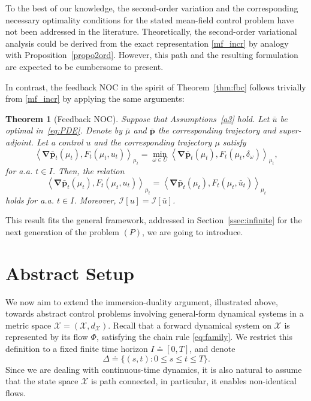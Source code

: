 \documentclass[sn-mathphys-num]{sn-jnl}
\numberwithin{equation}{section}
\theoremstyle{mythm}
\newtheorem{theorem}[proposition]{Theorem}
\theoremstyle{mydef}
\renewcommand{\mathbf}[1]{\bm{#1}}
\begin{document}
To the best of our knowledge, the second-order variation and the corresponding necessary optimality conditions for the stated mean-field control problem have not been addressed in the literature. Theoretically, the second-order variational analysis could be derived from the exact representation \eqref{mf_incr} by analogy with Proposition~\ref{propo2ord}. However, this path and the resulting formulation are expected to be cumbersome to present.

In contrast, the feedback NOC in the spirit of Theorem~\ref{thm:fbc} follows trivially from \eqref{mf_incr} by applying the same arguments:
\begin{theorem}[Feedback NOC]
  \label{thm:W-FNOC}
  Suppose that Assumptions~\ref{a3} hold. Let \( \bar{u} \) be optimal in~\eqref{eq:PDE}. Denote by \( \bar{\mu} \) and \( \mathbf{\bar{p}} \) the corresponding trajectory and super-adjoint. Let a control \( u \) and the corresponding trajectory \( \mu \) satisfy
\[
  \left<\mathbf{\nabla}\bar{\mathbf{p}}_t(\mu_t), F_t({\mu}_t,{u}_t)\right>_{{\mu}_t}  = \min_{\omega\in U} \left<\mathbf{\nabla}\bar{\mathbf{p}}_t(\mu_t),F_t(\mu_t,\delta_{\omega}) \right>_{\mu_t},
\]
for a.a. \( t\in I \). Then, the relation 
\[
\left<\mathbf{\nabla}\bar{\mathbf{p}}_t(\mu_t), F_t({\mu}_t,{u}_t)\right>_{{\mu}_t} = 
  \left<\mathbf{\nabla}\bar{\mathbf{p}}_t(\mu_t), F_t({\mu}_t,\bar{u}_t)\right>_{{\mu}_t}
\]
holds for a.a. \( t\in I \). Moreover, \( \mathcal I[u] = \mathcal I[\bar{u}] \).
\end{theorem}

This result fits the general framework, addressed in Section~\ref{ssec:infinite} for the next generation of the problem $(P)$, we are going to introduce.


\section{Abstract Setup}\label{sec:generapp}

We now aim to extend the immersion-duality argument, illustrated above, towards abstract control problems involving general-form dynamical systems in a metric space $\mathcal X = (\mathcal X, d_{\mathcal X})$. Recall that a forward dynamical system on $\mathcal X$ is represented by its flow $\Phi$, satisfying the chain rule \eqref{eq:family}. We restrict this definition to a fixed finite time horizon $I \doteq [0, T]$, and denote \[
\Delta \doteq \{(s,t) : 0 \leq s \leq t \leq T\}.
\] Since we are dealing with continuous-time dynamics, it is also natural to assume that the state space $\mathcal X$ is path connected, in particular, it enables non-identical flows. 
\end{document}
